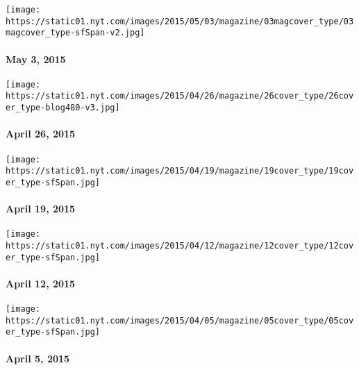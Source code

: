 \href{http://www.nytimes.com/indexes/2015/05/03/magazine/index.html}{}

\texttt{[image: https://static01.nyt.com/images/2015/05/03/magazine/03magcover\_type/03magcover\_type-sfSpan-v2.jpg]}

\hypertarget{may-3-2015}{%
\paragraph{May 3, 2015}\label{may-3-2015}}

\href{http://www.nytimes.com/indexes/2015/04/26/magazine/index.html}{}

\texttt{[image: https://static01.nyt.com/images/2015/04/26/magazine/26cover\_type/26cover\_type-blog480-v3.jpg]}

\hypertarget{april-26-2015}{%
\paragraph{April 26, 2015}\label{april-26-2015}}

\href{http://www.nytimes.com/indexes/2015/04/19/magazine/index.html}{}

\texttt{[image: https://static01.nyt.com/images/2015/04/19/magazine/19cover\_type/19cover\_type-sfSpan.jpg]}

\hypertarget{april-19-2015}{%
\paragraph{April 19, 2015}\label{april-19-2015}}

\href{http://www.nytimes.com/indexes/2015/04/12/magazine/index.html}{}

\texttt{[image: https://static01.nyt.com/images/2015/04/12/magazine/12cover\_type/12cover\_type-sfSpan.jpg]}

\hypertarget{april-12-2015}{%
\paragraph{April 12, 2015}\label{april-12-2015}}

\href{http://www.nytimes.com/indexes/2015/04/05/magazine/index.html}{}

\texttt{[image: https://static01.nyt.com/images/2015/04/05/magazine/05cover\_type/05cover\_type-sfSpan.jpg]}

\hypertarget{april-5-2015}{%
\paragraph{April 5, 2015}\label{april-5-2015}}

